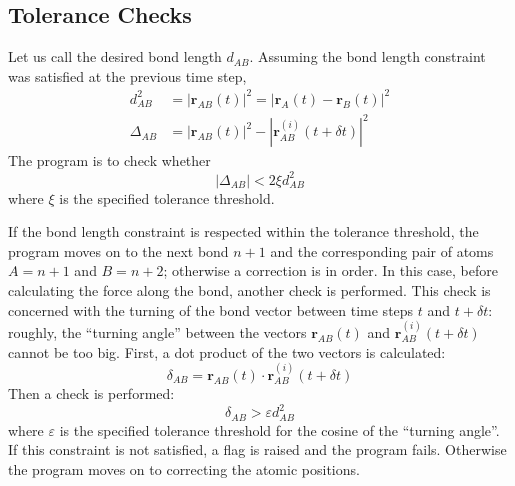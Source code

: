 \subsection{Tolerance Checks}
\label{sec:shake-tolerance-checks}
Let us call the desired bond length $d_{AB}$. Assuming the bond length constraint was satisfied at the previous time step, 
\begin{equation*}
\begin{aligned}
d^2_{AB} 	  &= \left|\mathbf{r}_{AB}(t)\right|^2 = \left|\mathbf{r}_A(t) - \mathbf{r}_B (t)\right|^2	\\
\Delta_{AB} &= |\mathbf{r}_{AB}(t)|^2 - |\mathbf{r}^{(i)}_{AB}(t + \delta t)|^2
\end{aligned}
\end{equation*}
The program is to check whether
\begin{equation}
\label{eq:check-rab}
\left| \Delta_{AB} \right| < 2\xi d^2_{AB} 
\end{equation}
where $\xi$ is the specified tolerance threshold.
\par If the bond length constraint is respected within the tolerance threshold, the program moves on to the next bond $n+1$ and the corresponding pair of atoms $A = n+1$ and $B = n+2$; otherwise a correction is in order. In this case, before calculating the force along the bond, another check is performed. This check is concerned with the turning of the bond vector between time steps $t$ and $t + \delta t$: roughly, the ``turning angle'' between the vectors $\mathbf{r}_{AB}(t)$ and $\mathbf{r}^{(i)}_{AB}(t + \delta t)$ cannot be too big. First, a dot product of the two vectors is calculated:
\begin{equation}
\label{eq:bond-angle-deltaab}
\delta_{AB} = \mathbf{r}_{AB}(t) \cdot \mathbf{r}^{(i)}_{AB}(t + \delta t)
\end{equation}
Then a check is performed:
\begin{equation}
\label{eq:check-deltaab}
\delta_{AB} > \varepsilon d^2_{AB} 
\end{equation}
where $\varepsilon$ is the specified tolerance threshold for the cosine of the ``turning angle''. If this constraint is not satisfied, a flag is raised and the program fails. Otherwise the program moves on to correcting the atomic positions.